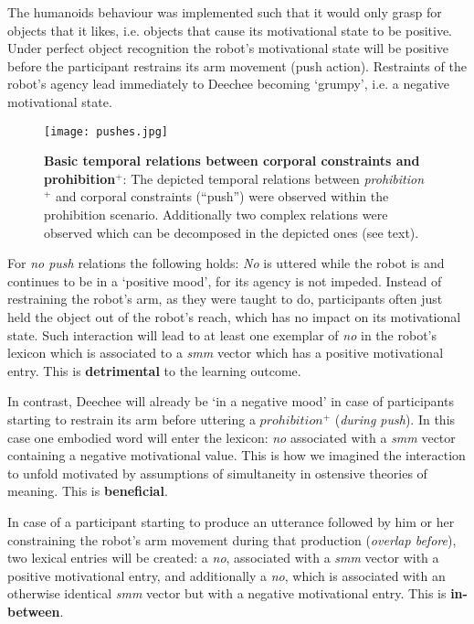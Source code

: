 \begin{screenonly}
The humanoids behaviour was implemented such that it would only grasp for objects that it likes, i.e. objects that cause its motivational state to be 
positive. Under perfect object recognition the robot's motivational state will be positive before the participant restrains its arm movement (push action).
Restraints of the robot's agency lead immediately to Deechee becoming `grumpy', i.e. a negative motivational state.
\begin{figure*}[h]
  \hspace*{-2ex}
  \texttt{[image: pushes.jpg]}
  \caption{\textbf{Basic temporal relations between corporal constraints and prohibition$^+$}: The depicted temporal relations between
    \emph{prohibition}$^+$ and corporal constraints (``push'') were observed within the prohibition scenario. Additionally
    two complex relations were observed which can be decomposed in the depicted ones (see text).}
  \label{fig:push_rels}
\end{figure*}
For \emph{no push} relations the following holds: \emph{No} is uttered while the robot is and continues to be in a `positive mood', for its agency 
is not impeded. Instead of restraining the robot's arm, as they were taught to do, participants often just held the object out of the robot's reach, 
which has no impact on its motivational state. Such interaction will lead to at least one exemplar of \emph{no} in the robot's lexicon which is 
associated to a \emph{smm} vector which has a positive motivational entry. This is \textbf{detrimental} to the learning outcome.

In contrast, Deechee will already be `in a negative mood' in case of participants starting to restrain its arm before uttering a $prohibition^+$
(\emph{during push}). In this case one embodied word will enter the lexicon: \emph{no} associated with a \emph{smm} vector containing a negative 
motivational value. This is how we imagined the interaction to unfold motivated by assumptions of simultaneity in ostensive theories of meaning. 
This is \textbf{beneficial}.

In case of a participant starting to produce an utterance followed by him or her constraining the robot's arm movement during that production (\emph{overlap before}), 
two lexical entries will be created: a \emph{no}, associated with a \emph{smm} vector with a positive motivational entry, and additionally a \emph{no}, which is 
associated with an otherwise identical \emph{smm} vector but with a negative motivational entry. This is \textbf{in-between}.


\end{screenonly}
